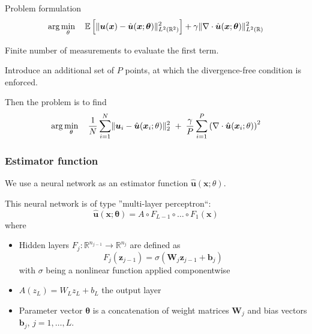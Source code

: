 \documentclass{beamer}
\renewcommand{\vec}[1]{\boldsymbol{#1}}
\newcommand{\mat}[1]{\boldsymbol{#1}}
\newcommand{\R}{\mathbb R}
\DeclarePairedDelimiter\norm{\lVert}{\rVert}
\begin{document}
\begin{frame}{Problem formulation}
\[
    \arg \min_\theta \quad 
        \mathbb E \left[ \norm{\vec u(\vec x) - \hat{\vec u}(\vec x; \vec{\theta})}^2_{L^2(\R^2)} \right] +
        \gamma \norm{\nabla \cdot \hat{\vec u}(\vec x; \vec{\theta})}^2_{L^2(\R)} 
\]

Finite number of measurements to evaluate the first term. 

Introduce an additional set of $P$ points, at which
the divergence-free condition is enforced.

Then the problem is to find
\[
    \arg \min_\theta \quad
        \frac{1}{N} \sum_{i=1}^N \norm{\vec u_i - \hat{\vec u}(\vec x_i; \theta)}^2_2
        \ + \;
        \frac{\gamma}{P} \sum_{i=1}^P \left( \nabla \cdot \hat{\vec u}(\vec x_i; \theta)\right)^2
\]
\end{frame}

\begin{frame}
\frametitle{Estimator function}

We use a neural network as an estimator function $\hat{\vec u}(\vec x; \theta)$.

This neural network is of type ''multi-layer perceptron``:
\[
    \hat{\vec u}(\vec x; \vec \theta) = A \circ F_{L-1} \circ \dots \circ F_1(\vec x)
\]
where
\begin{itemize}
 \item Hidden layers $F_j : \R^{n_{j-1}} \to \R^{n_j}$ are defined as
\[
    F_j\left( \vec z_{j-1} \right) = \sigma \left( \mat W_j \vec z_{j-1} + \vec b_j \right)
\]
with $\sigma$ being a nonlinear function applied componentwise

\item $A(z_L) = W_L z_L + b_L$ the output layer

\item Parameter vector $\vec \theta$ is a concatenation of weight matrices $\mat W_j$
and bias vectors $\vec b_j$, $j=1,\dots,L$.
\end{itemize}
\end{frame}
\end{document}
